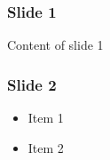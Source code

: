 \documentclass[english,svgnames,notes=hide,14pt]{beamer}
\title{\large\presentationtitle}
\author{Alexander Cox\\
		\small Supervised by Michael Norrish\\
		\small The Australian National University
	}
\date{\today}
\begin{document}
\thispagestyle{empty}
\begin{frame}
  \titlepage
\end{frame}




\begin{frame}
	\frametitle{Slide 1}

	Content of slide 1
\end{frame}


\begin{frame}
	\frametitle{Slide 2}

	\begin{itemize}
		\item Item 1
		\item Item 2
	\end{itemize}
\end{frame}
\end{document}
